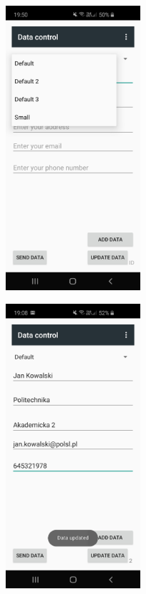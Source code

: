 \documentclass[a4paper,12pt, twoside]{article}
\begin{document}
\begin{enumerate}
\begin{figure}[H]
\begin{minipage}{.5\textwidth}
    	            \centering
    	            \includegraphics[width=5cm]{images/view_dataControl.jpg}
                    \label{fig:dataControl}
                \end{minipage}%
                \begin{minipage}{.5\textwidth}
                    \centering
    	            \includegraphics[width=5cm]{images/view_dataEdit.jpg}
                    \label{fig:dataEdit}

\end{minipage}
\end{figure}
\end{enumerate}
\end{document}
